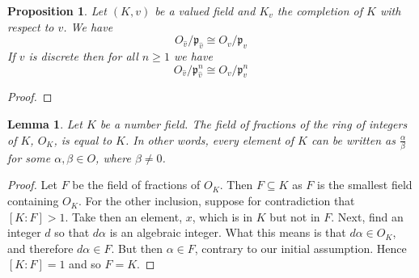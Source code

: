 \documentclass{article}
\DeclareMathOperator{\Frac}{Frac}
\newtheorem{definition}{Definition}[section]
\newtheorem{proposition}{Proposition}[section]
\newtheorem{lemma}{Lemma}[section]
\newcommand{\mfrak}[1]{\mathfrak{#1}}
\begin{document}






\begin{proposition}\label{prop: Isomorphism of residue fields valued field and its completion}
    Let $(K, v)$ be a valued field and $K_v$ the completion of $K$ with respect to $v$. We have
    $$O_{\hat v} / \mfrak p_{\hat v} \cong O_v / \mfrak p_v$$
    If $v$ is discrete then for all $n \geq 1$ we have
    $$O_{\hat v} / \mfrak p_{\hat v}^n \cong O_v / \mfrak p_v^n$$
\end{proposition}
\begin{proof}
    
\end{proof}


\begin{lemma} \label{lem: Field of fractions of ring of integers is number field}
    Let $K$ be a number field. The field of fractions of the ring of integers of $K$, $O_K$, is equal to $K$. In other words, every element of $K$ can be written as $\frac{\alpha}{\beta}$ for some $\alpha, \beta \in O$, where $\beta \neq 0$.
\end{lemma}
\begin{proof}
    Let $F$ be the field of fractions of $O_K$. Then $F \subseteq K$ as $F$ is the smallest field containing $O_K$. For the other inclusion, suppose for contradiction that $[K : F] > 1$. Take then an element, $x$, which is in $K$ but not in $F$. Next, find an integer $d$ so that $d \alpha$ is an algebraic integer. What this means is that $d \alpha \in O_K$, and therefore $d \alpha \in F$. But then $\alpha \in F$, contrary to our initial assumption. Hence $[K : F] = 1$ and so $F = K$.
\end{proof}


\end{document}
